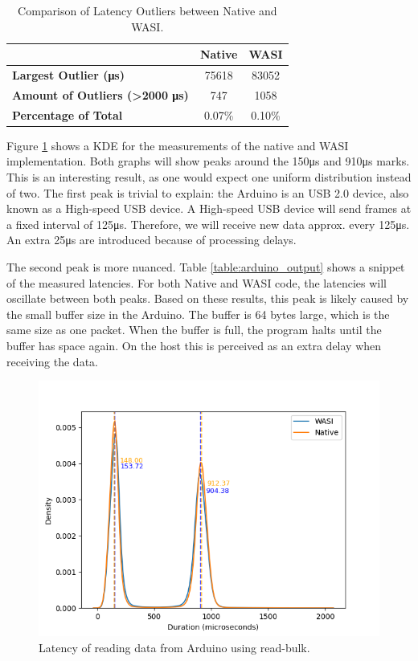 \begin{table}[h]
\centering
\begin{tabular}{|l|c|c|}
\hline
 & \textbf{Native} & \textbf{WASI} \\ \hline
\textbf{Largest Outlier (μs)} & 75618 & 83052 \\ \hline
\textbf{Amount of Outliers (\textgreater 2000 μs)} & 747 & 1058 \\ \hline
\textbf{Percentage of Total} & 0.07\% & 0.10\% \\ \hline
\end{tabular}
\caption{Comparison of Latency Outliers between Native and WASI.}
\label{table:latency_comparison}
\end{table}



Figure \ref{fig:arduino_reading_latency} shows a \acrfull{KDE} for the measurements of the native and \acrshort{WASI} implementation.
Both graphs will show peaks around the 150μs and 910μs marks. This is an interesting result, as one would expect one uniform distribution instead of two. The first peak is trivial to explain: the Arduino is an USB 2.0 device, also known as a High-speed USB device. A High-speed USB device will send frames at a fixed interval of 125μs. Therefore, we will receive new data approx. every 125μs. An extra 25μs are introduced because of processing delays. 

The second peak is more nuanced. Table \ref{table:arduino_output} shows a snippet of the measured latencies. For both Native and WASI code, the latencies will oscillate between both peaks. Based on these results, this peak is likely caused by the small buffer size in the Arduino. The buffer is 64 bytes large, which is the same size as one packet. When the buffer is full, the program halts until the buffer has space again. On the host this is perceived as an extra delay when receiving the data.

\begin{figure}[H]
  \centering
  \includegraphics[width=1\textwidth]{images/reading_data_latency.png}
  \caption{Latency of reading data from Arduino using read-bulk.}
  \label{fig:arduino_reading_latency}
\end{figure}

